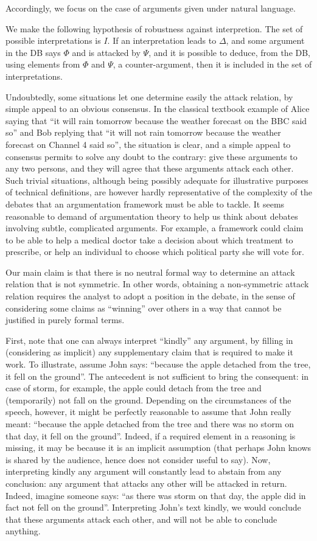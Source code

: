 \documentclass[version=3.21, pagesize, twoside=off, bibliography=totoc, DIV=calc, fontsize=12pt, a4paper, french, english]{scrartcl}
\begin{document}
Accordingly, we focus on the case of arguments given under natural language. 

We make the following hypothesis of robustness against interpretion. The set of possible interpretations is $I$. If an interpretation leads to $\Delta$, and some argument in the DB says $\Phi$ and is attacked by $\Psi$, and it is possible to deduce, from the DB, using elements from $\Phi$ and $\Psi$, a counter-argument, then it is included in the set of interpretations.

Undoubtedly, some situations let one determine easily the attack relation, by simple appeal to an obvious consensus. In the classical textbook example of Alice saying that “it will rain tomorrow because the weather forecast on the BBC said so” and Bob replying that “it will not rain tomorrow because the weather forecast on Channel 4 said so”, the situation is clear, and a simple appeal to consensus permits to solve any doubt to the contrary: give these arguments to any two persons, and they will agree that these arguments attack each other. Such trivial situations, although being possibly adequate for illustrative purposes of technical definitions, are however hardly representative of the complexity of the debates that an argumentation framework must be able to tackle. It seems reasonable to demand of argumentation theory to help us think about debates involving subtle, complicated arguments. For example, a framework could claim to be able to help a medical doctor take a decision about which treatment to prescribe, or help an individual to choose which political party she will vote for.

Our main claim is that there is no neutral formal way to determine an attack relation that is not symmetric. In other words, obtaining a non-symmetric attack relation requires the analyst to adopt a position in the debate, in the sense of considering some claims as “winning” over others in a way that cannot be justified in purely formal terms.

First, note that one can always interpret “kindly” any argument, by filling in (considering as implicit) any supplementary claim that is required to make it work. To illustrate, assume John says: “because the apple detached from the tree, it fell on the ground”. The antecedent is not sufficient to bring the consequent: in case of storm, for example, the apple could detach from the tree and (temporarily) not fall on the ground. Depending on the circumstances of the speech, however, it might be perfectly reasonable to assume that John really meant: “because the apple detached from the tree and there was no storm on that day, it fell on the ground”. Indeed, if a required element in a reasoning is missing, it may be because it is an implicit assumption (that perhaps John knows is shared by the audience, hence does not consider useful to say). Now, interpreting kindly any argument will constantly lead to abstain from any conclusion: any argument that attacks any other will be attacked in return. Indeed, imagine someone says: “as there was storm on that day, the apple did in fact not fell on the ground”. Interpreting John’s text kindly, we would conclude that these arguments attack each other, and will not be able to conclude anything.
\end{document}
